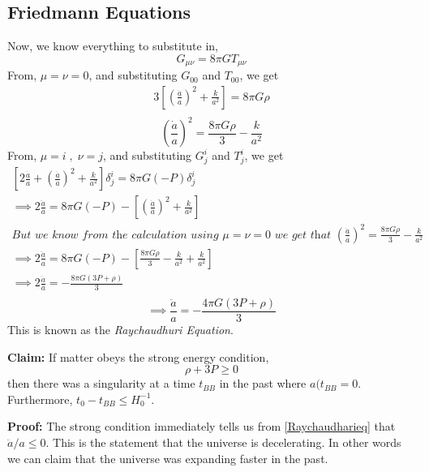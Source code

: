 \documentclass[12pt]{report}
\newcommand{\tit}[1]{\textit{#1}}
\begin{document}
\subsection{Friedmann Equations}
Now, we know everything to substitute in,
\begin{equation*}
G_{\mu \nu}=8 \pi G T_{\mu \nu}
\end{equation*}
 From, $\mu=\nu=0$, and substituting $G_{00}$ and $T_{00}$, we get
 \begin{eqnarray*}
 3\left[\left(\frac{\dot{a}}{a}\right)^2 +\frac{k}{a^2}\right]=8\pi G \rho\\
 \end{eqnarray*}
\begin{equation}\label{continuityeq}
 \left(\frac{\dot{a}}{a}\right)^2= \frac{8 \pi G \rho}{3} - \frac{k}{a^2}
\end{equation}
 From, $\mu=i \; , \;\nu=j$, and substituting $G^i_{j}$ and $T^i_{j}$, we get 
 \begin{eqnarray*}
 \left[2\frac{\ddot{a}}{a} + \left(\frac{\dot{a}}{a}\right)^2 +\frac{k}{a^2}\right] \delta^i_j=8 \pi G (-P)\delta^i_j\\
\implies  2\frac{\ddot{a}}{a}=8 \pi G (-P) - \left[\left(\frac{\dot{a}}{a}\right)^2 +\frac{k}{a^2}\right]\\
 \tit{But we know from the calculation using $\mu=\nu=0$ we get that $\left(\frac{\dot{a}}{a}\right)^2= \frac{8 \pi G \rho}{3} - \frac{k}{a^2}$}\\
\implies  2\frac{\ddot{a}}{a}=8 \pi G (-P) - \left[\frac{8 \pi G \rho}{3} - \frac{k}{a^2} +\frac{k}{a^2}\right]\\ 
\implies  2\frac{\ddot{a}}{a}= - \frac{8\pi G (3P+ \rho)}{3}\\
 \end{eqnarray*}
 \begin{equation}\label{Raychaudharieq}
 \implies  \frac{\ddot{a}}{a}= - \frac{4\pi G (3P+ \rho)}{3}
 \end{equation}
 This is known as the \tit{Raychaudhuri Equation}.
 
 \textbf{Claim:} If matter obeys the strong energy condition,
 \begin{equation}
 \rho + 3P \geq 0
 \end{equation}
 then there was a singularity at a time $t_{BB}$ in the past where $a(t_{BB}=0$. Furthermore, $t_0 - t_{BB} \leq H_0^{-1}$.
 
 \textbf{Proof:} The strong condition immediately tells us from \eqref{Raychaudharieq} that $\ddot{a}/a \leq 0$. This is the statement that the universe is decelerating. In other words we can claim that the universe was expanding faster in the past.
 
\end{document}
